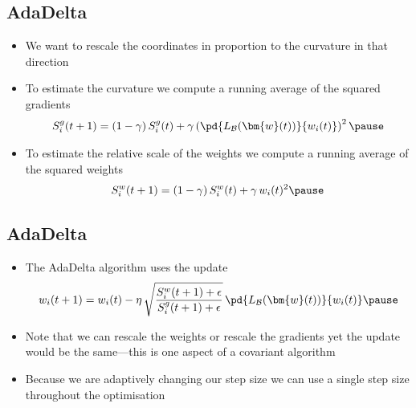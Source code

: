 
\begin{slide}
  \section[-2]{AdaDelta}

  \begin{PauseHighLight}
    \begin{itemize}
    \item We want to rescale the coordinates in proportion to the
      curvature in that direction\pause
    \item To estimate the curvature we compute a running average of
      the squared gradients
      \begin{align*}
        S^g_i(t+1) = (1-\gamma)\, S^g_i(t) + \gamma \left(
        \pd{L_{\mathcal{B}}(\bm{w}(t))}{w_i(t)} \right)^2\pause
      \end{align*}
    \item To estimate the relative scale of the weights we compute a
      running average of the squared weights
      \begin{align*}
        S^w_i(t+1) = (1-\gamma) \, S^w_i(t) + \gamma \, w_i(t)^2\pause
      \end{align*}
     \end{itemize}
  \end{PauseHighLight}

\end{slide}


\begin{slide}
\section{AdaDelta}

\begin{PauseHighLight}
  \begin{itemize}
  \item The AdaDelta algorithm uses the update
    \begin{align*}
       w_i(t+1)
        = w_i(t) - \eta \,
        \sqrt{\frac{S^w_i(t+1)+\epsilon}{S^g_i(t+1)+\epsilon}}\,
        \pd{L_{\mathcal{B}}(\bm{w}(t))}{w_i(t)}\pause
    \end{align*}
  \item Note that we can rescale the weights or rescale the
    gradients yet the update would be the same\pause---this is one
    aspect of a covariant algorithm\pauseb
  \item Because we are adaptively changing our step size we can use a
    single step size throughout the optimisation\pause
  \end{itemize}
\end{PauseHighLight}

\end{slide}

